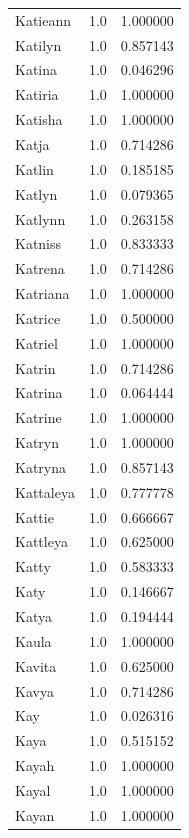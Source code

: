 \documentclass[
  letterpaper,
  DIV=11,
  numbers=noendperiod]{scrreprt}
\begin{document}
\begin{tabular}{lrr}
Katieann        &   1.0 &   1.000000 \\
Katilyn         &   1.0 &   0.857143 \\
Katina          &   1.0 &   0.046296 \\
Katiria         &   1.0 &   1.000000 \\
Katisha         &   1.0 &   1.000000 \\
Katja           &   1.0 &   0.714286 \\
Katlin          &   1.0 &   0.185185 \\
Katlyn          &   1.0 &   0.079365 \\
Katlynn         &   1.0 &   0.263158 \\
Katniss         &   1.0 &   0.833333 \\
Katrena         &   1.0 &   0.714286 \\
Katriana        &   1.0 &   1.000000 \\
Katrice         &   1.0 &   0.500000 \\
Katriel         &   1.0 &   1.000000 \\
Katrin          &   1.0 &   0.714286 \\
Katrina         &   1.0 &   0.064444 \\
Katrine         &   1.0 &   1.000000 \\
Katryn          &   1.0 &   1.000000 \\
Katryna         &   1.0 &   0.857143 \\
Kattaleya       &   1.0 &   0.777778 \\
Kattie          &   1.0 &   0.666667 \\
Kattleya        &   1.0 &   0.625000 \\
Katty           &   1.0 &   0.583333 \\
Katy            &   1.0 &   0.146667 \\
Katya           &   1.0 &   0.194444 \\
Kaula           &   1.0 &   1.000000 \\
Kavita          &   1.0 &   0.625000 \\
Kavya           &   1.0 &   0.714286 \\
Kay             &   1.0 &   0.026316 \\
Kaya            &   1.0 &   0.515152 \\
Kayah           &   1.0 &   1.000000 \\
Kayal           &   1.0 &   1.000000 \\
Kayan           &   1.0 &   1.000000 \\

\end{tabular}
\end{document}
